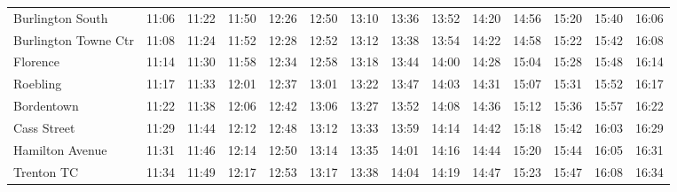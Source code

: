\begin{center}
\begin{tabular}{@{}lrrrrrrrrrrrrr@{}}
Burlington South & 11:06 & 11:22 & 11:50 & 12:26 & 12:50 & 13:10 & 13:36 & 13:52 & 14:20 & 14:56 & 15:20 & 15:40 & 16:06 \\
Burlington Towne Ctr & 11:08 & 11:24 & 11:52 & 12:28 & 12:52 & 13:12 & 13:38 & 13:54 & 14:22 & 14:58 & 15:22 & 15:42 & 16:08 \\
Florence & 11:14 & 11:30 & 11:58 & 12:34 & 12:58 & 13:18 & 13:44 & 14:00 & 14:28 & 15:04 & 15:28 & 15:48 & 16:14 \\
Roebling & 11:17 & 11:33 & 12:01 & 12:37 & 13:01 & 13:22 & 13:47 & 14:03 & 14:31 & 15:07 & 15:31 & 15:52 & 16:17 \\
Bordentown & 11:22 & 11:38 & 12:06 & 12:42 & 13:06 & 13:27 & 13:52 & 14:08 & 14:36 & 15:12 & 15:36 & 15:57 & 16:22 \\
Cass Street & 11:29 & 11:44 & 12:12 & 12:48 & 13:12 & 13:33 & 13:59 & 14:14 & 14:42 & 15:18 & 15:42 & 16:03 & 16:29 \\
Hamilton Avenue & 11:31 & 11:46 & 12:14 & 12:50 & 13:14 & 13:35 & 14:01 & 14:16 & 14:44 & 15:20 & 15:44 & 16:05 & 16:31 \\
Trenton TC & 11:34 & 11:49 & 12:17 & 12:53 & 13:17 & 13:38 & 14:04 & 14:19 & 14:47 & 15:23 & 15:47 & 16:08 & 16:34 \\
\bottomrule\end{tabular}\end{center}
